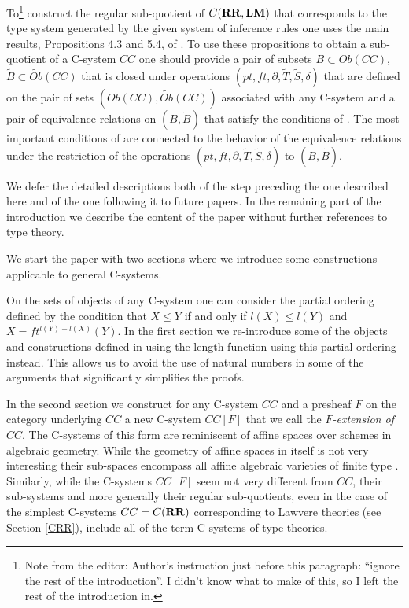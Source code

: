 \documentclass[12pt]{amsart}
\numberwithin{proposition}{subsection}
\newcommand{\wt}{\widetilde}
\newcommand{\RR}{{\bf RR}}
\newcommand{\LM}{{\bf LM}}
\newcommand{\editorfootnote}[1]{\footnote{Note from the editor: #1}}
\begin{document}
To\editorfootnote{Author's instruction just before this paragraph:
  ``ignore the rest of the introduction''.  I didn't know what to make of this,
  so I left the rest of the introduction in.}
construct the regular sub-quotient of $C(\RR,\LM)$ that corresponds to the
type system generated by the given system of inference rules one uses the main
results, Propositions 4.3 and 5.4, of \cite{Csubsystems}. To use these
propositions to obtain a sub-quotient of a C-system $CC$ one should provide a
pair of subsets $B\subset Ob(CC)$, $\wt{B}\subset \wt{Ob}(CC)$ that is closed
under operations $(pt,ft,\partial,\wt{T},\wt{S},\delta)$ that are defined on
the pair of sets $(Ob(CC),\wt{Ob}(CC))$ associated with any C-system
\cite[Prop. 4.3]{Csubsystems} and a pair of equivalence relations on
$(B,\wt{B})$ that satisfy the conditions of \cite[Prop. 5.4]{Csubsystems}. The
most important conditions of \cite[Prop. 5.4]{Csubsystems} are connected to the
behavior of the equivalence relations under the restriction of the operations
$(pt,ft,\partial,\wt{T},\wt{S},\delta)$ to $(B,\wt{B})$.

We defer the detailed descriptions both of the step preceding the one described
here and of the one following it to future papers. In the remaining part of the
introduction we describe the content of the paper without further references to
type theory.

We start the paper with two sections where we introduce some constructions
applicable to general C-systems.

On the sets of objects of any C-system one can consider the partial ordering
defined by the condition that $X\le Y$ if and only if $l(X)\le l(Y)$ and
$X=ft^{l(Y)-l(X)}(Y)$. In the first section we re-introduce some of the objects
and constructions defined in \cite{Csubsystems} using the length function using
this partial ordering instead. This allows us to avoid the use of natural numbers
in some of the arguments that significantly simplifies the proofs.

In the second section we construct for any C-system $CC$ and a presheaf $F$ on
the category underlying $CC$ a new C-system $CC[F]$ that we call the
{\em $F$-extension of $CC$}. The C-systems of this form are reminiscent of affine
spaces over schemes in algebraic geometry. While the geometry of affine spaces
in itself is not very interesting their sub-spaces encompass all affine
algebraic varieties of finite type . Similarly, while the C-systems $CC[F]$
seem not very different from $CC$, their sub-systems and more generally their
regular sub-quotients, even in the case of the simplest C-systems $CC=C(\RR)$
corresponding to Lawvere theories (see Section \ref{CRR}), include all of the
term C-systems of type theories.
\end{document}
